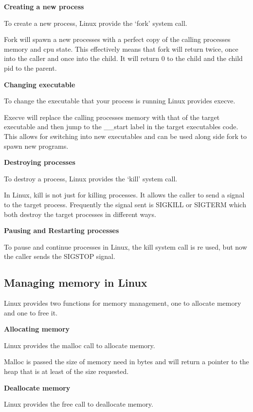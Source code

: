 \documentclass[a4paper]{report}
\begin{document}
\noindent
\textbf{Creating a new process}

To create a new process, Linux provide the `fork' system call. \cite{manFork}

Fork will spawn a new processes with a perfect copy of the calling processes memory and cpu state. This effectively means that fork will return twice, once into the caller and once into the child. It will return 0 to the child and the child pid to the parent.

\noindent
\textbf{Changing executable}

To change the executable that your process is running Linux provides execve. \cite{manExecve}

Execve will replace the calling processes memory with that of the target executable and then jump to the \_\_start label in the target executables code. This allows for switching into new executables and can be used along side fork to spawn new programs.

\noindent
\textbf{Destroying processes}

To destroy a process, Linux provides the `kill' system call. \cite{manKill}

In Linux, kill is not just for killing processes. It allows the caller to send a signal to the target process. Frequently the signal sent is SIGKILL or SIGTERM which both destroy the target processes in different ways.

\noindent
\textbf{Pausing and Restarting processes}

To pause and continue processes in Linux, the kill system call is re used, but now the caller sends the SIGSTOP signal.

\subsection{Managing memory in Linux}

Linux provides two functions for memory management, one to allocate memory and one to free it.

\noindent
\textbf{Allocating memory}

Linux provides the malloc call to allocate memory. \cite{manMalloc}

Malloc is passed the size of memory need in bytes and will return a pointer to the heap that is at least of the size requested.

\noindent
\textbf{Deallocate memory}

Linux provides the free call to deallocate memory.
\end{document}
